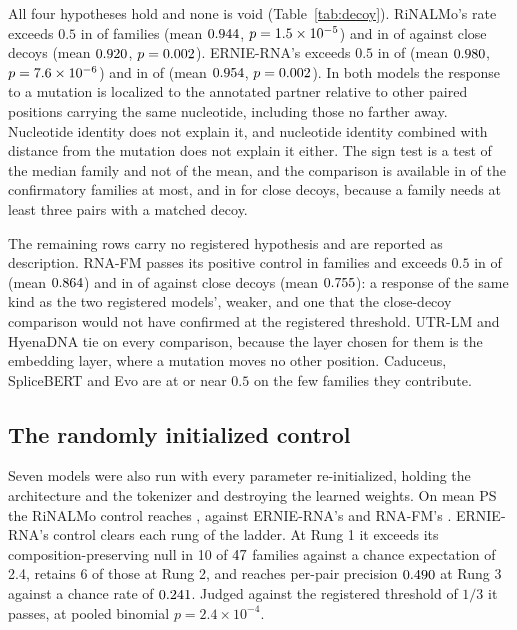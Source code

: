 \documentclass[11pt]{article}
\begin{document}
All four hypotheses hold and none is void (Table~\ref{tab:decoy}). RiNALMo's
rate exceeds $0.5$ in \decoyAllAboveRiNALMo{} of \decoyAllFamiliesRiNALMo{}
families (mean $0.944{}$, $p = 1.5 \times 10^{-5}{}$) and in
\decoyCloseAboveRiNALMo{} of \decoyCloseFamiliesRiNALMo{} against close decoys
(mean $0.920{}$, $p = 0.002{}$). ERNIE-RNA's
exceeds $0.5$ in \decoyAllAboveErnieRNA{} of \decoyAllFamiliesErnieRNA{}
(mean $0.980{}$, $p = 7.6 \times 10^{-6}{}$) and in
\decoyCloseAboveErnieRNA{} of \decoyCloseFamiliesErnieRNA{}
(mean $0.954{}$, $p = 0.002{}$). In both
models the response to a mutation is localized to the annotated partner
relative to other paired positions carrying the same nucleotide, including
those no farther away. Nucleotide identity does not explain it, and nucleotide
identity combined with distance from the mutation does not explain it either.
The sign test is a test of the median family and not of the mean, and the
comparison is available in \decoyAllFamiliesErnieRNA{} of the \confirmatoryN{}
confirmatory families at most, and in \decoyCloseFamiliesErnieRNA{} for close
decoys, because a family needs at least three pairs with a matched decoy.

The remaining rows carry no registered hypothesis and are reported as
description. RNA-FM passes its positive control in
\decoyPopulationRNAFM{} families and exceeds $0.5$ in \decoyAllAboveRNAFM{} of
\decoyAllFamiliesRNAFM{} (mean $0.864{}$) and in
\decoyCloseAboveRNAFM{} of \decoyCloseFamiliesRNAFM{} against close decoys
(mean $0.755{}$): a response of the same kind as the two
registered models', weaker, and one that the close-decoy comparison would not
have confirmed at the registered threshold. UTR-LM and HyenaDNA tie on every
comparison, because the layer chosen for them is the embedding layer, where a
mutation moves no other position. Caduceus, SpliceBERT and Evo are at or near
$0.5$ on the few families they contribute.

\subsection{The randomly initialized control}
\label{sec:random-init}

Seven models were also run with every parameter re-initialized, holding the
architecture and the tokenizer and destroying the learned weights. On mean PS
the RiNALMo control reaches \psUntrainedRiNALMo{}, against ERNIE-RNA's
\psUntrainedErnieRNA{} and RNA-FM's \psUntrainedRNAFM{}. ERNIE-RNA's
control clears each rung of the ladder. At Rung 1 it exceeds its
composition-preserving null in 10 of $47{}$ families against a chance
expectation of 2.4, retains 6 of those at Rung 2, and reaches per-pair precision
$0.490{}$ at Rung 3 against a chance rate of
$0.241{}$. Judged against the
registered threshold of $1/3$ it passes, at pooled binomial $p = 2.4 \times
10^{-4}$.
\end{document}
